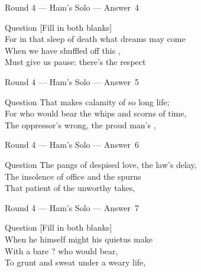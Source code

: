 \documentclass[11pt]{beamer}
\begin{document}
\begin{frame}[t]{Round 4 --- Ham's Solo --- \mbox{Answer 4}}
\vspace{-0.5em}
\begin{block}{Question}
[Fill in both blanks]\\
For in that sleep of death what dreams may come\\
When we have shuffled off this \textunderscore{}\textunderscore{}\textunderscore{}\textunderscore{}\textunderscore{} \textunderscore{}\textunderscore{}\textunderscore{}\textunderscore{}\textunderscore{},\\
Must give us pause: there's the respect
\end{block}
\end{frame}
\begin{frame}[t]{Round 4 --- Ham's Solo --- \mbox{Answer 5}}
\vspace{-0.5em}
\begin{block}{Question}
That makes calamity of so long life;\\
For who would bear the whips and scorns of time,\\
The oppressor's wrong, the proud man's \textunderscore{}\textunderscore{}\textunderscore{}\textunderscore{}\textunderscore{},
\end{block}
\end{frame}
\begin{frame}[t]{Round 4 --- Ham's Solo --- \mbox{Answer 6}}
\vspace{-0.5em}
\begin{block}{Question}
The pangs of despised love, the law's delay,\\
The insolence of office and the spurns\\
That patient \textunderscore{}\textunderscore{}\textunderscore{}\textunderscore{}\textunderscore{} of the unworthy takes,
\end{block}
\end{frame}
\begin{frame}[t]{Round 4 --- Ham's Solo --- \mbox{Answer 7}}
\vspace{-0.5em}
\begin{block}{Question}
[Fill in both blanks]\\
When he himself might his quietus make\\
With a bare \textunderscore{}\textunderscore{}\textunderscore{}\textunderscore{}\textunderscore{}? who would \textunderscore{}\textunderscore{}\textunderscore{}\textunderscore{}\textunderscore{} bear,\\
To grunt and sweat under a weary life,
\end{block}
\end{frame}
\end{document}
